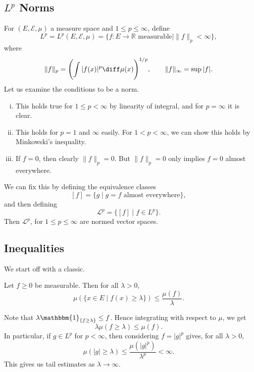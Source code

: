 \documentclass[12pt]{article}
\begin{document}
\subsection{\texorpdfstring{$L^p$}{L^p} Norms}
\label{sub:lp_norm}

For $(E, \mathcal{E}, \mu)$ a measure space and $1 \leq p \leq \infty$, define
\[
	L^p = L^p(E, \mathcal{E}, \mu) = \{f : E \to \mathbb{R} \text{ measurable} \mid \|f\|_p < \infty\},
\]
where
\[
\|f\|_p = \Biggl( \int |f(x)|^p \diff \mu(x) \Biggr)^{1/p}, \qquad \|f\|_\infty = \sup|f|.
\]
Let us examine the conditions to be a norm.
\begin{enumerate}[(i)]
	\item This holds true for $1 \leq p < \infty$ by linearity of integral, and for $p = \infty$ it is clear.
	\item This holds for $p = 1$ and $\infty$ easily. For $1 < p < \infty$, we can show this holds by Minkowski's inequality.
	\item If $f = 0$, then clearly $\|f\|_p = 0$. But $\|f\|_p = 0$ only implies $f = 0$ almost everywhere.
\end{enumerate}
We can fix this by defining the equivalence classes
\[
	[f] = \{g \mid g = f \text{ almost everywhere}\},
\]
and then defining
\[
	\mathcal{L}^{p} = \{[f] \mid f \in L^p\}.
\]
Then $\mathcal{L}^{p}$, for $1 \leq p \leq \infty$ are normed vector spaces.

\subsection{Inequalities}
\label{sub:ineqs}

We start off with a classic.

\begin{theorem}
	Let $f \geq 0$ be measurable. Then for all $\lambda > 0$,
	\[
		\mu(\{x \in E \mid f(x) \geq \lambda\}) \leq \frac{\mu(f)}{\lambda}.
	\]
\end{theorem}

\begin{proofbox}
	Note that $\lambda \mathbbm{1}_{\{f \geq \lambda\}} \leq f$. Hence integrating with respect to $\mu$, we get
	\[
	\lambda \mu (f \geq \lambda) \leq \mu(f).
	\]
	In particular, if $g \in L^p$ for $p < \infty$, then considering $f = |g|^p$ gives, for all $\lambda > 0$,
	\[
	\mu(|g| \geq \lambda) \leq \frac{\mu(|g|^p)}{\lambda^p} < \infty.
	\]
	This gives us tail estimates as $\lambda \to \infty$.
\end{proofbox}
\end{document}
